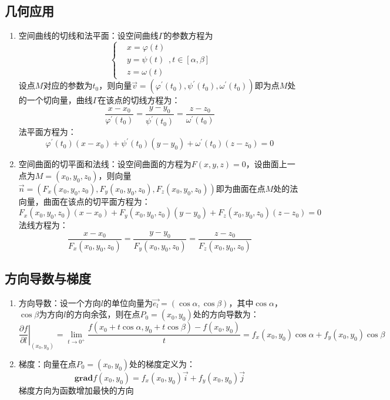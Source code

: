 \documentclass[12pt,a4paper,UTF8]{book}
\begin{document}
\subsection{几何应用}
\begin{enumerate}
\item 空间曲线的切线和法平面：设空间曲线$\Gamma$的参数方程为
\[\left\{\begin{aligned}&x=\varphi\left(t\right)\\&y=\psi\left(t\right)\\&z=\omega\left(t\right)\end{aligned}\right.,t\in\left[\alpha,\beta\right]\]
设点$M$对应的参数为$t_0$，则向量$\vec{v}=\left(\varphi^{\prime}\left(t_0\right),\psi^{\prime}\left(t_0\right),\omega^{\prime}\left(t_0\right)\right)$即为点$M$处的一个切向量，曲线$\Gamma$在该点的切线方程为：
\[\frac{x-x_0}{\varphi^{\prime}\left(t_0\right)}=\frac{y-y_0}{\psi^{\prime}\left(t_0\right)}=\frac{z-z_0}{\omega^{\prime}\left(t_0\right)}\]
法平面方程为：
\[\varphi^{\prime}\left(t_0\right)\left(x-x_0\right)+\psi^{\prime}\left(t_0\right)\left(y-y_0\right)+\omega^{\prime}\left(t_0\right)\left(z-z_0\right)=0\]
\item 空间曲面的切平面和法线：设空间曲面的方程为$F\left(x,y,z\right)=0$，设曲面上一点为$M=\left(x_0,y_0,z_0\right)$，则向量$\vec{n}=\left(F_x\left(x_0,y_0,z_0\right),F_y\left(x_0,y_0,z_0\right),F_z\left(x_0,y_0,z_0\right)\right)$即为曲面在点$M$处的法向量，曲面在该点的切平面方程为：
\[F_x\left(x_0,y_0,z_0\right)\left(x-x_0\right)+F_y\left(x_0,y_0,z_0\right)\left(y-y_0\right)+F_z\left(x_0,y_0,z_0\right)\left(z-z_0\right)=0\]
法线方程为：
\[\frac{x-x_0}{F_x\left(x_0,y_0,z_0\right)}=\frac{y-y_0}{F_y\left(x_0,y_0,z_0\right)}=\frac{z-z_0}{F_z\left(x_0,y_0,z_0\right)}\]
\end{enumerate}

\subsection{方向导数与梯度}
\begin{enumerate}
\item 方向导数：设一个方向$l$的单位向量为$\vec{e_l}=\left(\cos\alpha,\cos\beta\right)$，其中$\cos\alpha$，$\cos\beta$为方向$l$的方向余弦，则在点$P_0=\left(x_0,y_0\right)$处的方向导数为：
\[\left.\frac{\partial f}{\partial l}\right|_{\left(x_0,y_0\right)}=\lim\limits_{t\to0^{+}}\frac{f\left(x_0+t\cos\alpha,y_0+t\cos\beta\right)-f\left(x_0,y_0\right)}{t}=f_x\left(x_0,y_0\right)\cos\alpha+f_y\left(x_0,y_0\right)\cos\beta\]
\item 梯度：向量在点$P_0=\left(x_0,y_0\right)$处的梯度定义为：
\[\mathbf{grad}f\left(x_0,y_0\right)=f_x\left(x_0,y_0\right)\vec{i}+f_y\left(x_0,y_0\right)\vec{j}\]
梯度方向为函数增加最快的方向
\end{enumerate}
\end{document}
